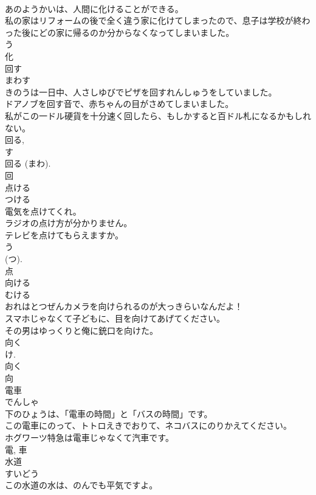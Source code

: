 \documentclass[8pt]{extreport}
\begin{document}
\begin{CJK}{UTF8}{min}
\\	あのようかいは、人間に化けることができる。	
\\	私の家はリフォームの後で全く違う家に化けてしまったので、息子は学校が終わった後にどの家に帰るのか分からなくなってしまいました。	
\\	う 
\\	化	
\\	回す	
\\	まわす	
\\	きのうは一日中、人さしゆびでピザを回すれんしゅうをしていました。	
\\	ドアノブを回す音で、赤ちゃんの目がさめてしまいました。	
\\	私がこの一ドル硬貨を十分速く回したら、もしかすると百ドル札になるかもしれない。	
\\	回る, 
\\	す 
\\	回る (まわ). 
\\	回	
\\	点ける	
\\	つける	
\\	電気を点けてくれ。	
\\	ラジオの点け方が分かりません。	
\\	テレビを点けてもらえますか。	
\\	う 
\\	(つ). 
\\	点	
\\	向ける	
\\	むける	
\\	おれはとつぜんカメラを向けられるのが大っきらいなんだよ！	
\\	スマホじゃなくて子どもに、目を向けてあげてください。	
\\	その男はゆっくりと俺に銃口を向けた。	
\\	向く 
\\	け. 
\\	向く 
\\	向	
\\	電車	
\\	でんしゃ	
\\	下のひょうは、「電車の時間」と「バスの時間」です。	
\\	この電車にのって、トトロえきでおりて、ネコバスにのりかえてください。	
\\	ホグワーツ特急は電車じゃなくて汽車です。	
\\	電, 車	
\\	水道	
\\	すいどう	
\\	この水道の水は、のんでも平気ですよ。	

\end{CJK}
\end{document}
